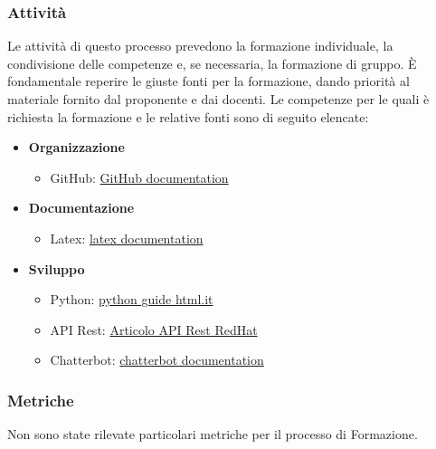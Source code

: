 \subsubsection{Attività}
Le attività di questo processo prevedono la formazione individuale, la condivisione delle competenze e, se 
necessaria, la formazione di gruppo. È fondamentale reperire le giuste fonti per la formazione, dando priorità 
al materiale fornito dal proponente e dai docenti. Le competenze per le quali è richiesta la formazione e le 
relative fonti sono di seguito elencate:
\begin{itemize}
	\item \textbf{Organizzazione}
		\begin{itemize}		
			\item GitHub: \href{https://docs.github.com/en}{GitHub documentation}
		\end{itemize}
	\item \textbf{Documentazione}
		\begin{itemize}
			\item Latex: \href{https://www.latex-project.org/help/}{latex documentation}
		\end{itemize}
	\item \textbf{Sviluppo}
		\begin{itemize}
			\item Python: \href{https://www.html.it/guide/guida-python/}{python guide html.it}
			\item API Rest: \href{https://www.redhat.com/it/topics/api/what-is-a-rest-api}{Articolo API Rest RedHat}
			\item Chatterbot: \href{https://chatterbot.readthedocs.io/en/stable/}{chatterbot documentation}
		\end{itemize}
\end{itemize}

\subsubsection{Metriche} 
Non sono state rilevate particolari metriche per il processo di Formazione.